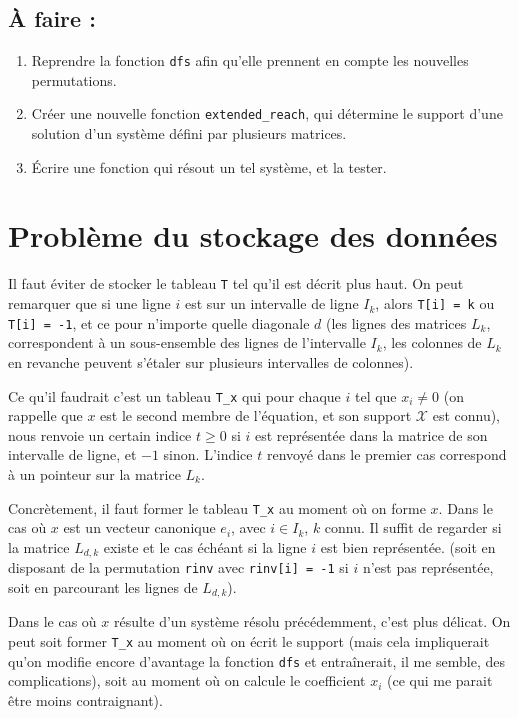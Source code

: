 \documentclass{article}
\begin{document}
\subsection{À faire :} 
\begin{enumerate}
\item Reprendre la fonction \verb$dfs$ afin qu'elle prennent en compte les nouvelles permutations.
\item Créer une nouvelle fonction \verb$extended_reach$, qui détermine le support d'une solution d'un système défini par plusieurs matrices.
\item Écrire une fonction qui résout un tel système, et la tester.
\end{enumerate}

\section{Problème du stockage des données}

Il faut éviter de stocker le tableau \verb$T$ tel qu'il est décrit plus haut. On peut remarquer que si une ligne $i$ est sur un intervalle de ligne $I_k$, alors \verb$T[i] = k$ ou \verb$T[i] = -1$, et ce pour n'importe quelle diagonale $d$ (les lignes des matrices $L_k$, correspondent à un sous-ensemble des lignes de l'intervalle $I_k$, les colonnes de $L_k$ en revanche peuvent s'étaler sur plusieurs intervalles de colonnes).

Ce qu'il faudrait c'est un tableau \verb$T_x$ qui pour chaque $i$ tel que $x_i \not= 0$ (on rappelle que $x$ est le second membre de l'équation, et son support $\mathcal{X}$ est connu), nous renvoie un certain indice $t \geq 0$ si $i$ est représentée dans la matrice de son intervalle de ligne, et $-1$ sinon.
L'indice $t$ renvoyé dans le premier cas correspond à un pointeur sur la matrice $L_k$.

Concrètement, il faut former le tableau \verb$T_x$ au moment où on forme $x$. 
Dans le cas où $x$ est un vecteur canonique $e_i$, avec $i \in I_k$, $k$ connu. Il suffit de regarder si la matrice $L_{d,k}$ existe et le cas échéant si la ligne $i$ est bien représentée. (soit en disposant de la permutation \verb$rinv$ avec \verb$rinv[i] = -1$ si $i$ n'est pas représentée, soit en parcourant les lignes de $L_{d,k}$).

Dans le cas où $x$ résulte d'un système résolu précédemment, c'est plus délicat. On peut soit former \verb$T_x$ au moment où on écrit le support (mais cela impliquerait qu'on modifie encore d'avantage la fonction \verb$dfs$ et entraînerait, il me semble, des complications), soit au moment où on calcule le coefficient $x_i$ (ce qui me parait être moins contraignant).
\end{document}
